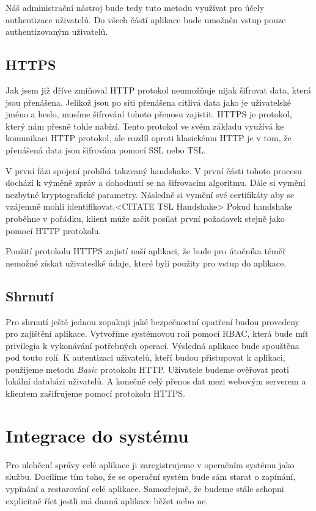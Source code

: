     Náš administrační nástroj bude tedy tuto metodu využívat pro účely authentizace uživatelů. Do všech částí aplikace bude umožněn vstup pouze authentizovaným uživatelů.

    \subsection{HTTPS}
    \label{https}
    Jak jsem již dříve zmiňoval HTTP protokol neumožňuje nijak šifrovat data, která jsou přenášena. Jelikož jsou po síti přenášena citlivá data jako je uživatelské jméno a heslo, musíme šifrování tohoto přenosu zajistit. HTTPS je protokol, který nám přesně tohle nabízí. Tento protokol ve svém základu využívá ke komunikaci HTTP protokol, ale rozdíl oproti klasickému HTTP je v tom, že přenášená data jsou šifrována pomocí SSL nebo TSL.

    V první fázi spojení probíhá takzvaný handshake. V první části tohoto procesu dochází k výměně zpráv a dohodnutí se na šifrovacím algoritmu. Dále si vymění nezbytné kryptografické parametry. Následně si vymění své certifikáty aby se vzájemně mohli identifikovat.<CITATE TSL Handshake> Pokud handshake proběhne v pořádku, klient může začít posílat první požadavek stejně jako pomocí HTTP protokolu.

    Použití protokolu HTTPS zajistí naší aplikaci, že bude pro útočníka téměř nemožné získat uživateslké údaje, které byli použity pro vstup do aplikace.
    \subsection{Shrnutí}
    Pro shrnutí ještě jednou zopakuji jaké bezpečnostní opatření budou provedeny pro zajištění aplikace. Vytvoříme systémovou roli pomocí RBAC, která bude mít privilegia k vykonávání potřebných operací. Výsledná aplikace bude spouštěna pod touto rolí. K autentizaci uživatelů, kteří budou přistupovat k aplikaci, použijeme metodu \emph{Basic} protokolu HTTP. Uživatele budeme ověřovat proti lokální databázi uživatelů. A konečně celý přenos dat mezi webovým serverem a klientem zašifrujeme pomocí protokolu HTTPS.

\section{Integrace do systému}
Pro ulehčení správy celé aplikace ji zaregistrujeme v operačním systému jako službu. Docílíme tím toho, že se operační systém bude sám starat o zapínání, vypínání a restarování celé aplikace. Samozřejmě, že budeme stále schopni explicitně říct jestli má danná aplikace běžet nebo ne.

